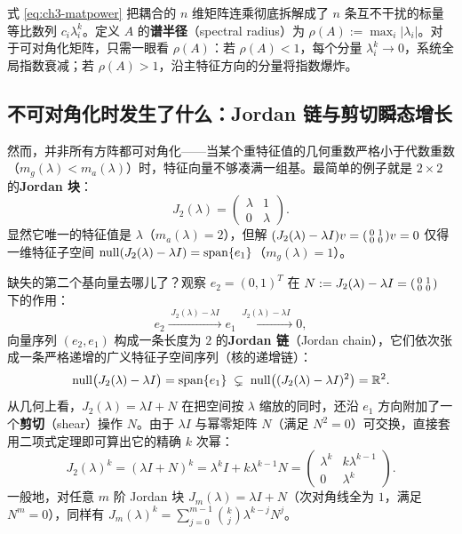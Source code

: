式 \eqref{eq:ch3-matpower} 把耦合的 $n$ 维矩阵连乘彻底拆解成了 $n$ 条互不干扰的标量等比数列 $c_i \lambda_i^k$。定义 $A$ 的\textbf{谱半径}（spectral radius）为 $\rho(A) := \max_i |\lambda_i|$。对于可对角化矩阵，只需一眼看 $\rho(A)$：若 $\rho(A) < 1$，每个分量 $\lambda_i^k \to 0$，系统全局指数衰减；若 $\rho(A) > 1$，沿主特征方向的分量将指数爆炸。

\subsection{不可对角化时发生了什么：Jordan 链与剪切瞬态增长}

然而，并非所有方阵都可对角化——当某个重特征值的几何重数严格小于代数重数（$m_g(\lambda) < m_a(\lambda)$）时，特征向量不够凑满一组基。最简单的例子就是 $2\times 2$ 的\textbf{Jordan 块}：
\[
  J_2(\lambda) = \begin{pmatrix} \lambda & 1 \\ 0 & \lambda \end{pmatrix}.
\]
显然它唯一的特征值是 $\lambda$（$m_a(\lambda)=2$），但解 $(J_2(\lambda)-\lambda I)v = \begin{psmallmatrix}0&1\\0&0\end{psmallmatrix}v = 0$ 仅得一维特征子空间 $\operatorname{null}(J_2(\lambda)-\lambda I) = \operatorname{span}\{e_1\}$（$m_g(\lambda)=1$）。

缺失的第二个基向量去哪儿了？观察 $e_2 = (0,1)^T$ 在 $N := J_2(\lambda) - \lambda I = \begin{psmallmatrix}0&1\\0&0\end{psmallmatrix}$ 下的作用：
\[
  e_2 \xrightarrow{\;J_2(\lambda)-\lambda I\;} e_1 \xrightarrow{\;J_2(\lambda)-\lambda I\;} 0,
\]
向量序列 $(e_2, e_1)$ 构成一条长度为 $2$ 的\textbf{Jordan 链}（Jordan chain），它们依次张成一条严格递增的广义特征子空间序列（核的递增链）：
\[
  \operatorname{null}\bigl(J_2(\lambda)-\lambda I\bigr) = \operatorname{span}\{e_1\} \;\subsetneq\; \operatorname{null}\bigl((J_2(\lambda)-\lambda I)^2\bigr) = \mathbb{R}^2.
\]
从几何上看，$J_2(\lambda) = \lambda I + N$ 在把空间按 $\lambda$ 缩放的同时，还沿 $e_1$ 方向附加了一个\textbf{剪切}（shear）操作 $N$。由于 $\lambda I$ 与幂零矩阵 $N$（满足 $N^2 = 0$）可交换，直接套用二项式定理即可算出它的精确 $k$ 次幂：
\begin{equation}
  J_2(\lambda)^k = (\lambda I + N)^k = \lambda^k I + k \lambda^{k-1} N = \begin{pmatrix} \lambda^k & k \lambda^{k-1} \\ 0 & \lambda^k \end{pmatrix}. \label{eq:ch3-jordan-power}
\end{equation}
一般地，对任意 $m$ 阶 Jordan 块 $J_m(\lambda) = \lambda I + N$（次对角线全为 $1$，满足 $N^m = 0$），同样有 $J_m(\lambda)^k = \sum_{j=0}^{m-1} \binom{k}{j}\lambda^{k-j} N^j$。

